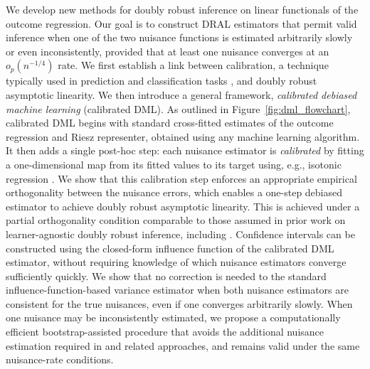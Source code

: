 \documentclass[11pt]{article}
\theoremstyle{plain}
\begin{document}
 
We develop new methods for doubly robust inference on linear functionals of the outcome regression. Our goal is to construct DRAL estimators that permit valid inference when one of the two nuisance functions is estimated arbitrarily slowly or even inconsistently, provided that at least one nuisance converges at an \(o_p(n^{-1/4})\) rate. We first establish a link between calibration, a technique typically used in prediction and classification tasks \citep{zadrozny2001obtaining, niculescu2005predicting}, and doubly robust asymptotic linearity. We then introduce a general framework, \emph{calibrated debiased machine learning} (calibrated DML). {\color{purple} As outlined in Figure~\ref{fig:dml_flowchart}, calibrated DML begins with standard cross-fitted estimates of the outcome regression and Riesz representer, obtained using any machine learning algorithm. It then adds a single post-hoc step: each nuisance estimator is \emph{calibrated} by fitting a one-dimensional map from its fitted values to its target using, e.g., isotonic regression \citep{barlow1972isotonic}. We show that this calibration step enforces an appropriate empirical orthogonality between the nuisance errors, which enables a one-step debiased estimator to achieve doubly robust asymptotic linearity. This is achieved under a partial orthogonality condition comparable to those
assumed in prior work on learner-agnostic doubly robust inference, including
\cite{van2014targeted,benkeser2017doubly,diaz2017doubly,dukes2024doubly,bonvini2024doubly}.}  Confidence intervals can be constructed using the closed-form influence function of the calibrated DML estimator, without requiring knowledge of which nuisance estimators converge sufficiently quickly. We show that no correction is needed to the standard influence-function-based variance estimator when both nuisance estimators are consistent for the true nuisances, even if one converges arbitrarily slowly. When one nuisance may be inconsistently estimated, we propose a computationally efficient bootstrap-assisted procedure that avoids the additional nuisance estimation required in \cite{van2014targeted} and related approaches, {\color{purple} and remains valid under the same nuisance-rate conditions. }


 

 
\end{document}
